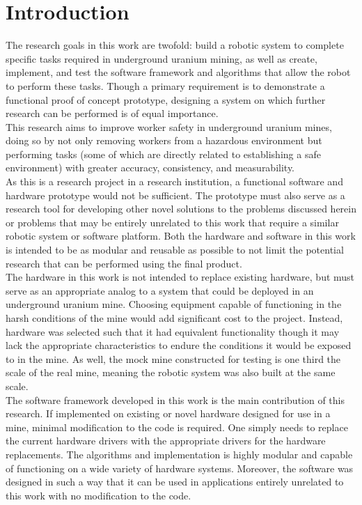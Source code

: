 \chapter{Introduction}
\label{chap:introduction}

The research goals in this work are twofold: build a robotic system to complete specific tasks required in underground uranium mining, as well as create, implement, and test the software framework and algorithms that allow the robot to perform these tasks. Though a primary requirement is to demonstrate a functional proof of concept prototype, designing a system on which further research can be performed is of equal importance.\\

This research aims to improve worker safety in underground uranium mines, doing so by not only removing workers from a hazardous environment but performing tasks (some of which are directly related to establishing a safe environment) with greater accuracy, consistency, and measurability.\\

As this is a research project in a research institution, a functional software and hardware prototype would not be sufficient. The prototype must also serve as a research tool for developing other novel solutions to the problems discussed herein or problems that may be entirely unrelated to this work that require a similar robotic system or software platform. Both the hardware and software in this work is intended to be as modular and reusable as possible to not limit the potential research that can be performed using the final product.\\

The hardware in this work is not intended to replace existing hardware, but must serve as an appropriate analog to a system that could be deployed in an underground uranium mine. Choosing equipment capable of functioning in the harsh conditions of the mine would add significant cost to the project. Instead, hardware was selected such that it had equivalent functionality though it may lack the appropriate characteristics to endure the conditions it would be exposed to in the mine. As well, the mock mine constructed for testing is one third the scale of the real mine, meaning the robotic system was also built at the same scale.\\

The software framework developed in this work is the main contribution of this research. If implemented on existing or novel hardware designed for use in a mine, minimal modification to the code is required. One simply needs to replace the current hardware drivers with the appropriate drivers for the hardware replacements. The algorithms and implementation is highly modular and capable of functioning on a wide variety of hardware systems. Moreover, the software was designed in such a way that it can be used in applications entirely unrelated to this work with no modification to the code.\\

